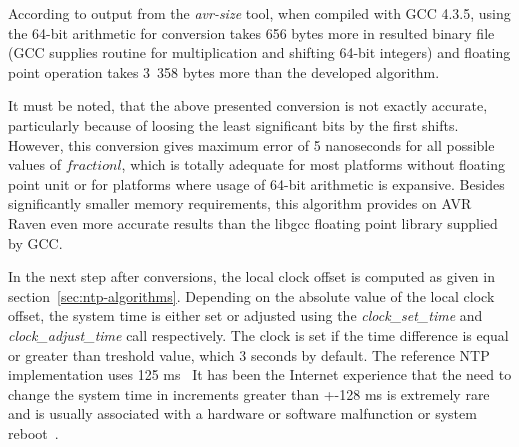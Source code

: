 According to output from the {\it{avr-size}} tool,
when compiled with GCC 4.3.5,
using the 64-bit arithmetic for conversion
takes 656 bytes more in %
resulted binary file (GCC supplies routine for multiplication and shifting 64-bit integers)
and floating point operation takes 3~358 bytes more
than the developed algorithm.

It must be noted, that the above presented conversion is not exactly accurate, particularly
because of loosing the least significant bits by the first shifts.
However, this conversion gives maximum error of 5 nanoseconds for all possible values of $fractionl$,
which is totally adequate for most platforms without floating point unit or
for platforms where usage of 64-bit arithmetic is expansive.
Besides significantly smaller memory requirements,
this algorithm provides on AVR Raven even more accurate results than the libgcc
floating point library supplied by GCC.


In the next step after conversions, the local clock offset is computed
as given in section~\ref{sec:ntp-algorithms}.
Depending on the absolute value of the local clock offset,
the system time is either set or adjusted using the {\it{clock\_set\_time}}
and {\it{clock\_adjust\_time}} call respectively.
The clock is set if the time difference is equal or greater than
treshold value, which 3 seconds by default. %
The reference NTP implementation uses 125 ms~\cite{rfc5905}
It has been the Internet
experience that the need to change the system time in increments
greater than +-128 ms is extremely rare and is usually associated
with a hardware or software malfunction or system reboot~\cite{rfc1589}.
